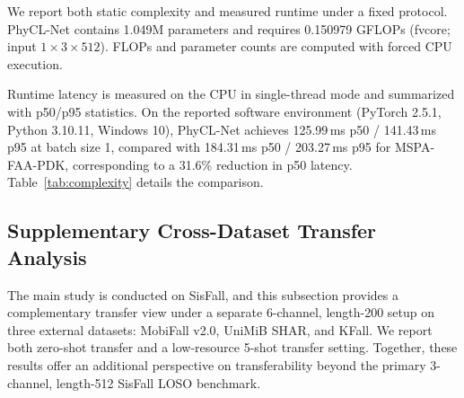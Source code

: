 \documentclass[jec]{acnsart}
\begin{document}
We report both static complexity and measured runtime under a fixed protocol. PhyCL-Net contains 1.049M parameters and requires 0.150979 GFLOPs (fvcore; input $1{\times}3{\times}512$). FLOPs and parameter counts are computed with forced CPU execution.

Runtime latency is measured on the CPU in single-thread mode and summarized with p50/p95 statistics. On the reported software environment (PyTorch 2.5.1, Python 3.10.11, Windows 10), PhyCL-Net achieves 125.99\,ms p50 / 141.43\,ms p95 at batch size 1, compared with 184.31\,ms p50 / 203.27\,ms p95 for MSPA-FAA-PDK, corresponding to a 31.6\% reduction in p50 latency. Table~\ref{tab:complexity} details the comparison.

\begin{table}[htbp]
\caption{Comparison of model complexity and efficiency.}
\label{tab:complexity}
\centering
{}
\end{table}

\subsection{Supplementary Cross-Dataset Transfer Analysis}

The main study is conducted on SisFall, and this subsection provides a complementary transfer view under a separate 6-channel, length-200 setup on three external datasets: MobiFall v2.0, UniMiB SHAR, and KFall. We report both zero-shot transfer and a low-resource 5-shot transfer setting. Together, these results offer an additional perspective on transferability beyond the primary 3-channel, length-512 SisFall LOSO benchmark.
\end{document}
